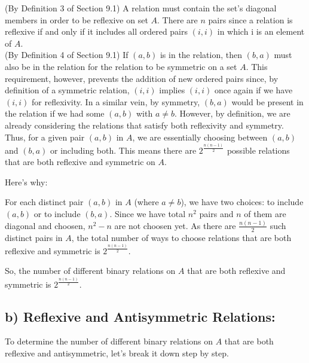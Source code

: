\documentclass[12pt]{article}
\begin{document}
(By Definition 3 of Section 9.1) A relation must contain the set's diagonal members in order to be reflexive on set \( A \). There are \( n \) pairs since a relation is reflexive if and only if it includes all ordered pairs \( (i, i) \) in which i is an element of \( A \).\\

(By Definition 4 of Section 9.1) If \( (a,b) \) is in the relation, then \( (b,a) \) must also be in the relation for the relation to be symmetric on a set \( A \). This requirement, however, prevents the addition of new ordered pairs since, by definition of a symmetric relation, \( (i,i) \) implies \( (i,i) \) once again if we have \( (i,i) \) for reflexivity. In a similar vein, by symmetry, \( (b, a) \) would be present in the relation if we had some \( (a, b) \) with \( a \neq b \).  However, by definition, we are already considering the relations that satisfy both reflexivity and symmetry.\\

Thus, for a given pair \( (a,b) \) in \( A \), we are essentially choosing between \( (a,b) \) and \( (b,a) \) or including both. This means there are \( 2^{\frac{n(n-1)}{2}} \) possible relations that are both reflexive and symmetric on \( A \).

Here's why:

For each distinct pair \( (a,b) \) in \( A \) (where \( a \neq b \)), we have two choices: to include \( (a,b) \) or to include \( (b,a) \). Since we have total \(n^2\) pairs and \(n\) of them are diagonal and choosen, \(n^2 - n\) are not choosen yet. As there are \( \frac{n(n-1)}{2} \) such distinct pairs in \( A \), the total number of ways to choose relations that are both reflexive and symmetric is \( 2^{\frac{n(n-1)}{2}} \).

So, the number of different binary relations on \( A \) that are both reflexive and symmetric is \( 2^{\frac{n(n-1)}{2}} \).


\subsection*{b) Reflexive and Antisymmetric Relations:}

To determine the number of different binary relations on \( A \) that are both reflexive and antisymmetric, let's break it down step by step.
\end{document}
